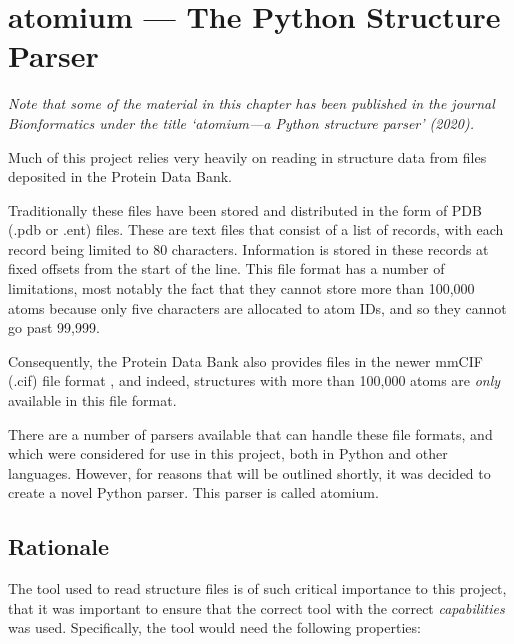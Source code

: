 


\chapter{atomium --- The Python Structure Parser} %
\label{Chapter3}


\emph{Note that some of the material in this chapter has been published in the journal Bionformatics under the title `atomium—a Python structure parser' (2020).}

Much of this project relies very heavily on reading in structure data from files deposited in the Protein Data Bank.

Traditionally these files have been stored and distributed in the form of PDB (.pdb or .ent) files. These are text files that consist of a list of records, with each record being limited to 80 characters. Information is stored in these records at fixed offsets from the start of the line. This file format has a number of limitations, most notably the fact that they cannot store more than 100,000 atoms because only five characters are allocated to atom IDs, and so they cannot go past 99,999.

Consequently, the Protein Data Bank also provides files in the newer mmCIF (.cif) file format \cite{hall1991mmcif}, and indeed, structures with more than 100,000 atoms are \emph{only} available in this file format.

There are a number of parsers available that can handle these file formats, and which were considered for use in this project, both in Python and other languages. However, for reasons that will be outlined shortly, it was decided to create a novel Python parser. This parser is called atomium.

\section{Rationale}

The tool used to read structure files is of such critical importance to this project, that it was important to ensure that the correct tool with the correct \emph{capabilities} was used. Specifically, the tool would need the following properties:

